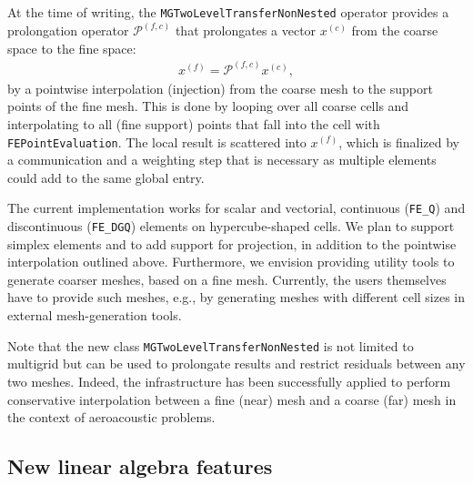\documentclass{ansarticle-preprint}
\begin{document}
At the time of writing, the \texttt{MGTwoLevelTransferNonNested} operator provides a prolongation operator $\mathcal{P}^{(f,c)}$
that prolongates a vector $x^{(c)}$ from the coarse space to the fine space:
\begin{align*}
x^{(f)} = \mathcal{P}^{(f, c)}  x^{(c)},
\end{align*}
by a pointwise interpolation (injection) from the coarse mesh to the support points of the fine mesh. This is done
by looping over all coarse cells and interpolating to all (fine support) points that fall into the cell with
\texttt{FEPointEvaluation}. The local result is scattered into $x^{(f)}$, which is finalized by a
communication and a weighting step that is necessary as multiple elements could add to the same global entry.


The current implementation works for scalar and vectorial, continuous (\texttt{FE\_Q})
and discontinuous (\texttt{FE\_DGQ}) elements on hypercube-shaped cells. We plan to support
simplex elements and to add support
for projection, in addition to the pointwise interpolation outlined
above. Furthermore, we envision providing utility tools to generate
coarser 
meshes, based on a fine mesh. Currently, the users themselves 
have to provide such meshes,
e.g., by generating meshes with different cell sizes in external mesh-generation tools.

Note that the new class \texttt{MGTwoLevelTransferNonNested} is not limited to
multigrid but can be used to prolongate results and restrict residuals between any
two meshes. Indeed, the infrastructure has been successfully applied to perform
conservative interpolation between a fine (near) mesh and a coarse (far) mesh in the
context of aeroacoustic problems.


\subsection{New linear algebra features}\label{sec:lac}
\end{document}
